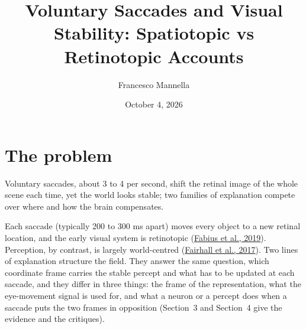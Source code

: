 \documentclass[11pt,a4paper]{article}
\title{Voluntary Saccades and Visual Stability: Spatiotopic vs Retinotopic Accounts}
\author{Francesco Mannella}
\date{October 4, 2026}
\begin{document}
\maketitle

\section{The problem}

Voluntary saccades, about 3 to 4 per second, shift the retinal image of the whole scene each time, yet the world looks stable; two families of explanation compete over where and how the brain compensates.

Each saccade (typically 200 to 300 ms apart) moves every object to a new retinal location, and the early visual system is retinotopic (\href{https://www.pnas.org/doi/10.1073/pnas.1812210116}{Fabius et al., 2019}). Perception, by contrast, is largely world-centred (\href{https://www.sciencedirect.com/science/article/pii/S1053811916306899}{Fairhall et al., 2017}). Two lines of explanation structure the field. They answer the same question, which coordinate frame carries the stable percept and what has to be updated at each saccade, and they differ in three things: the frame of the representation, what the eye-movement signal is used for, and what a neuron or a percept does when a saccade puts the two frames in opposition (Section~3 and Section~4 give the evidence and the critiques).
\end{document}
